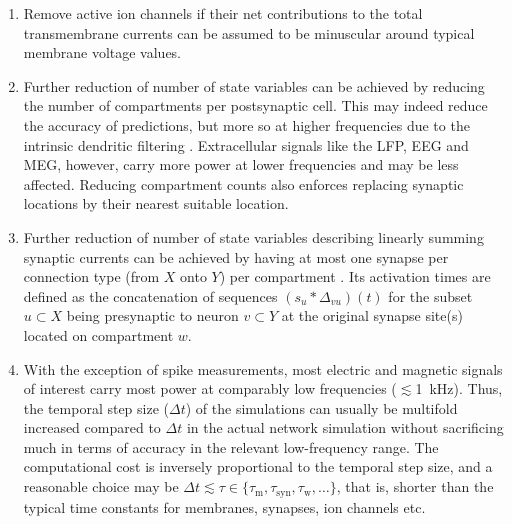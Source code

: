 \begin{enumerate}
\item Remove active ion channels  if their net contributions to the total transmembrane currents can be assumed to be minuscular around typical membrane voltage values. 

\item Further reduction of number of state variables 
can be achieved by reducing the number of compartments per postsynaptic cell. 
This may indeed reduce the accuracy of  predictions, 
but more so at higher frequencies due to the intrinsic dendritic filtering . 
Extracellular signals like the LFP, EEG and MEG, however, carry more power at lower frequencies and may be less affected. 
Reducing compartment counts also enforces replacing synaptic locations by their nearest suitable location.

\item Further reduction of number of state variables describing linearly summing synaptic currents can be achieved by having at most one synapse per connection type (from $X$ onto $Y$) per compartment .
Its activation times are defined as the concatenation of sequences $\left(s_u \ast \Delta_{vu} \right)(t)$ for the subset $u \subset X$ being presynaptic to neuron $v \subset Y$ at the original synapse site(s) located on compartment $w$. 

\item With the exception of spike measurements, most electric and magnetic signals of interest carry most power at comparably low frequencies ($\lesssim$\SI{1}{\kilo\hertz}).
Thus, the temporal step size ($\Delta t$) of the simulations can usually be multifold increased compared to $\Delta t$ in the actual network simulation without sacrificing much in terms of accuracy in the relevant low-frequency range.
The computational cost is inversely proportional to the temporal step size,
and a reasonable choice may be $\Delta t \lesssim \tau \in \{ \tau_\text{m}, \tau_\text{syn}, \tau_\text{w}, \ldots \}$,
that is, shorter than the typical time constants for membranes, synapses, ion channels etc.

\end{enumerate}

